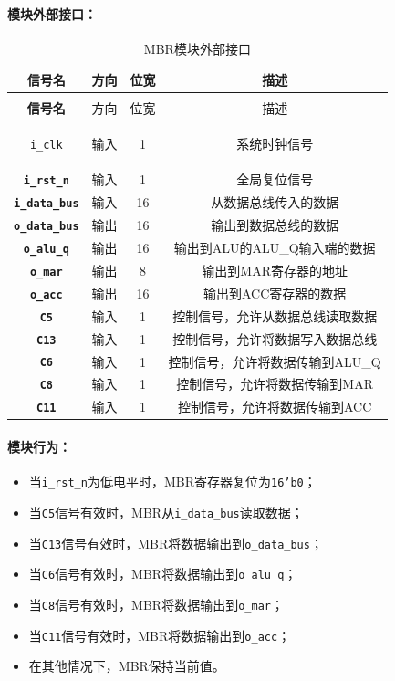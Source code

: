 \documentclass[lang=cn,a4paper,newtx]{elegantpaper}
\begin{document}
\paragraph{模块外部接口：}
\begin{longtable}{>{\bfseries}c c c c}
  \caption{MBR模块外部接口} \\ 
  \toprule
  信号名 & 方向 & 位宽 & 描述 \\ 
  \midrule
  \endfirsthead

  \multicolumn{4}{l}{\textbf{（续表）MBR模块外部接口}} \\ 
  \toprule
  信号名 & 方向 & 位宽 & 描述 \\ 
  \midrule
  \endhead

  \texttt{i\_clk} & 输入 & 1 & 系统时钟信号 \\ 
  \texttt{i\_rst\_n} & 输入 & 1 & 全局复位信号 \\ 
  \texttt{i\_data\_bus} & 输入 & 16 & 从数据总线传入的数据 \\ 
  \texttt{o\_data\_bus} & 输出 & 16 & 输出到数据总线的数据 \\ 
  \texttt{o\_alu\_q} & 输出 & 16 & 输出到ALU的ALU\_Q输入端的数据 \\ 
  \texttt{o\_mar} & 输出 & 8 & 输出到MAR寄存器的地址 \\ 
  \texttt{o\_acc} & 输出 & 16 & 输出到ACC寄存器的数据 \\ 
  \texttt{C5} & 输入 & 1 & 控制信号，允许从数据总线读取数据 \\ 
  \texttt{C13} & 输入 & 1 & 控制信号，允许将数据写入数据总线 \\ 
  \texttt{C6} & 输入 & 1 & 控制信号，允许将数据传输到ALU\_Q \\ 
  \texttt{C8} & 输入 & 1 & 控制信号，允许将数据传输到MAR \\ 
  \texttt{C11} & 输入 & 1 & 控制信号，允许将数据传输到ACC \\ 
  \bottomrule
\end{longtable}

\paragraph{模块行为：}
\begin{itemize}
  \item 当\texttt{i\_rst\_n}为低电平时，MBR寄存器复位为\texttt{16'b0}；
  \item 当\texttt{C5}信号有效时，MBR从\texttt{i\_data\_bus}读取数据；
  \item 当\texttt{C13}信号有效时，MBR将数据输出到\texttt{o\_data\_bus}；
  \item 当\texttt{C6}信号有效时，MBR将数据输出到\texttt{o\_alu\_q}；
  \item 当\texttt{C8}信号有效时，MBR将数据输出到\texttt{o\_mar}；
  \item 当\texttt{C11}信号有效时，MBR将数据输出到\texttt{o\_acc}；
  \item 在其他情况下，MBR保持当前值。
\end{itemize}
\end{document}
